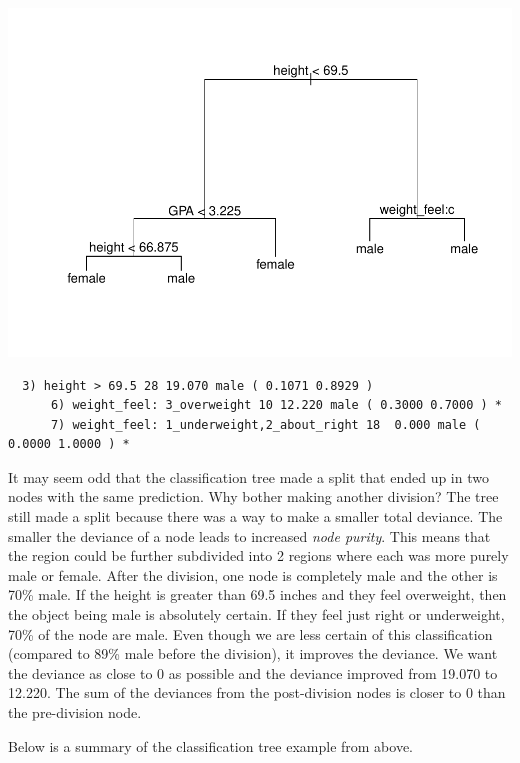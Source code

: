 \documentclass[12pt,twoside]{reedthesis}
\begin{document}
  \begin{center}\includegraphics{A_Random_Forest_Model_for_Computer-Assisted_Activity-Recognition_files/figure-latex/unnamed-chunk-5-1} \end{center}
  
  \begin{verbatim}
  3) height > 69.5 28 19.070 male ( 0.1071 0.8929 )  
      6) weight_feel: 3_overweight 10 12.220 male ( 0.3000 0.7000 ) *
      7) weight_feel: 1_underweight,2_about_right 18  0.000 male ( 0.0000 1.0000 ) *
  \end{verbatim}
  
  It may seem odd that the classification tree made a split that ended up
  in two nodes with the same prediction. Why bother making another
  division? The tree still made a split because there was a way to make a
  smaller total deviance. The smaller the deviance of a node leads to
  increased \emph{node purity}. This means that the region could be
  further subdivided into 2 regions where each was more purely male or
  female. After the division, one node is completely male and the other is
  70\% male. If the height is greater than 69.5 inches and they feel
  overweight, then the object being male is absolutely certain. If they
  feel just right or underweight, 70\% of the node are male. Even though
  we are less certain of this classification (compared to 89\% male before
  the division), it improves the deviance. We want the deviance as close
  to 0 as possible and the deviance improved from 19.070 to 12.220. The
  sum of the deviances from the post-division nodes is closer to 0 than
  the pre-division node.
  
  Below is a summary of the classification tree example from above.
  
\end{document}
